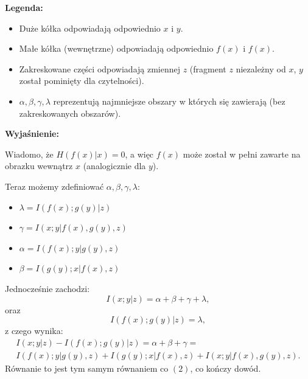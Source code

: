 \newpage
\textbf{Legenda:}

\begin{itemize}
	\item Duże kółka odpowiadają odpowiednio $x$ i $y$.
	\item Małe kółka (wewnętrzne) odpowiadają odpowiednio $f(x)$ i $f(x)$.
	\item Zakreskowane części odpowiadają zmiennej $z$ (fragment $z$ niezależny od $x$, $y$ został pominięty dla czytelności).
	\item $\alpha, \beta, \gamma, \lambda$ reprezentują najmniejsze obszary w których się zawierają (bez zakreskowanych obszarów).
\end{itemize}

\textbf{Wyjaśnienie:}

Wiadomo, że $H(f(x) | x) = 0$, a więc $f(x)$ może został w pełni zawarte na obrazku wewnątrz $x$ (analogicznie dla $y$).

Teraz możemy zdefiniować $\alpha, \beta, \gamma, \lambda$:
\begin{itemize}
	\item $\lambda = I(f(x) ; g(y) | z)$
	\item $\gamma = I(x ; y | f(x), g(y), z)$
	\item $\alpha = I(f(x) ; y | g(y), z)$
	\item $\beta = I(g(y) ; x | f(x), z)$
\end{itemize}

Jednocześnie zachodzi:
$$
	I(x; y|z) = \alpha + \beta + \gamma + \lambda,
$$
oraz
$$
	I(f(x) ; g(y) | z) = \lambda,
$$
z czego wynika:
\begin{multline*}
	I(x ; y | z) - I(f(x) ; g(y) | z) = \alpha + \beta + \gamma = \\
	I(f(x) ; y | g(y), z) + I(g(y) ; x | f(x), z) + I(x ; y | f(x), g(y), z).
\end{multline*}
Równanie to jest tym samym równaniem co $(2)$, co kończy dowód.



